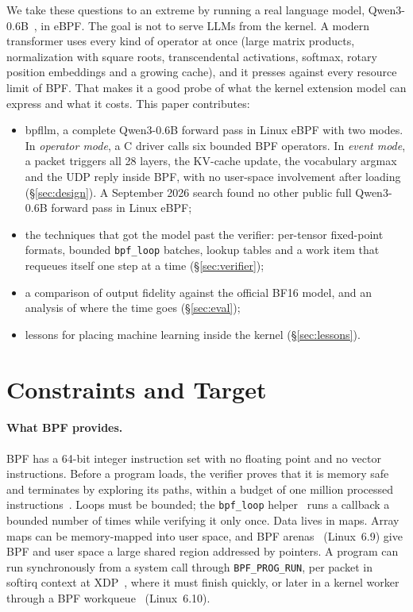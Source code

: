 \documentclass[sigconf,nonacm]{acmart}
\begin{document}
We take these questions to an extreme by running a real language model,
Qwen3-0.6B~\cite{qwen3}, in eBPF. The goal is not to serve LLMs from the
kernel. A modern transformer uses every kind of operator at once (large
matrix products, normalization with square roots, transcendental
activations, softmax, rotary position embeddings and a growing cache), and it
presses against every resource limit of BPF. That makes it a good probe of
what the kernel extension model can express and what it costs. This paper
contributes:

\begin{itemize}
\item bpfllm, a complete Qwen3-0.6B forward pass in Linux eBPF with two
modes. In \emph{operator mode}, a C driver calls six bounded BPF operators.
In \emph{event mode}, a packet triggers all 28 layers, the KV-cache update,
the vocabulary argmax and the UDP reply inside BPF, with no user-space
involvement after loading (\S\ref{sec:design}). A September 2026 search found
no other public full Qwen3-0.6B forward pass in Linux eBPF;
\item the techniques that got the model past the verifier: per-tensor
fixed-point formats, bounded \texttt{bpf\_loop} batches, lookup tables and a
work item that requeues itself one step at a time (\S\ref{sec:verifier});
\item a comparison of output fidelity against the official BF16 model, and an
analysis of where the time goes (\S\ref{sec:eval});
\item lessons for placing machine learning inside the kernel
(\S\ref{sec:lessons}).
\end{itemize}

\section{Constraints and Target}
\label{sec:background}

\paragraph{What BPF provides.} BPF has a 64-bit integer instruction set with
no floating point and no vector instructions. Before a program loads, the
verifier proves that it is memory safe and terminates by exploring its
paths, within a budget of one million processed
instructions~\cite{verifierdoc}. Loops must be bounded; the
\texttt{bpf\_loop} helper~\cite{bpfloop} runs a callback a bounded number of
times while verifying it only once. Data lives in maps. Array maps can be
memory-mapped into user space, and BPF arenas~\cite{arena} (Linux~6.9) give
BPF and user space a large shared region addressed by pointers. A program
can run synchronously from a system call through \texttt{BPF\_PROG\_RUN}, per
packet in softirq context at XDP~\cite{xdp}, where it must finish quickly, or
later in a kernel worker through a BPF workqueue~\cite{bpfwq} (Linux~6.10).
\end{document}

